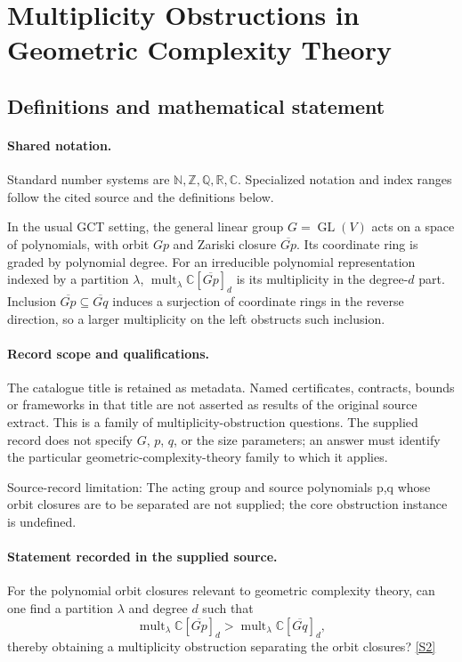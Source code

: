 \documentclass[11pt]{article}
\newcommand{\sref}[2]{\hyperlink{source:#1:#2}{[S#2]}}
\begin{document}
\section{Multiplicity Obstructions in Geometric Complexity Theory}\label{statement}

\subsection{Definitions and mathematical statement}

\paragraph{Shared notation.}Standard number systems are $\mathbb N,\mathbb Z,\mathbb Q,\mathbb R,\mathbb C$. Specialized notation and index ranges follow the cited source and the definitions below.


In the usual GCT setting, the general linear group $G=\operatorname{GL}(V)$ acts on a space of polynomials, with orbit $Gp$ and Zariski closure $\overline{Gp}$. Its coordinate ring is graded by polynomial degree. For an irreducible polynomial representation indexed by a partition $\lambda$, $\operatorname{mult}_\lambda\mathbb C[\overline{Gp}]_d$ is its multiplicity in the degree-$d$ part. Inclusion $\overline{Gp}\subseteq\overline{Gq}$ induces a surjection of coordinate rings in the reverse direction, so a larger multiplicity on the left obstructs such inclusion.
\paragraph{Record scope and qualifications.}
The catalogue title is retained as metadata. Named certificates, contracts, bounds or frameworks in that title are not asserted as results of the original source extract.
This is a family of multiplicity-obstruction questions. The supplied record does not specify $G$, $p$, $q$, or the size parameters; an answer must identify the particular geometric-complexity-theory family to which it applies.

Source-record limitation: The acting group and source polynomials p,q whose orbit closures are to be separated are not supplied; the core obstruction instance is undefined.
\paragraph{Statement recorded in the supplied source.}
For the polynomial orbit closures relevant to geometric complexity theory, can one find a partition $\lambda$ and degree $d$ such that
$$
\operatorname{mult}_\lambda\mathbb C[\overline{Gp}]_d>\operatorname{mult}_\lambda\mathbb C[\overline{Gq}]_d,
$$
thereby obtaining a multiplicity obstruction separating the orbit closures? \sref{statement}{2}
\end{document}
